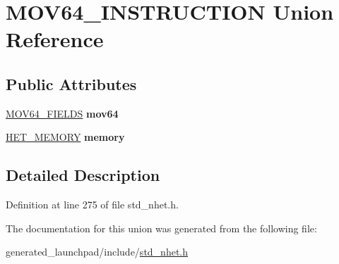 \hypertarget{unionMOV64__INSTRUCTION}{}\section{M\+O\+V64\+\_\+\+I\+N\+S\+T\+R\+U\+C\+T\+I\+ON Union Reference}
\label{unionMOV64__INSTRUCTION}
\subsection*{Public Attributes}
\begin{DoxyCompactItemize}
\item 
\mbox{\label{unionMOV64__INSTRUCTION_abbfdc4db4c42e65564e1d516d8ffa64f}} 
\mbox{\hyperlink{structmov64__format}{M\+O\+V64\+\_\+\+F\+I\+E\+L\+DS}} {\bfseries mov64}
\item 
\mbox{\label{unionMOV64__INSTRUCTION_af1332869b4112caf710fad63dfd1c7c5}} 
\mbox{\hyperlink{structmemory__format}{H\+E\+T\+\_\+\+M\+E\+M\+O\+RY}} {\bfseries memory}
\end{DoxyCompactItemize}


\subsection{Detailed Description}


Definition at line 275 of file std\+\_\+nhet.\+h.



The documentation for this union was generated from the following file\+:\begin{DoxyCompactItemize}
\item 
generated\+\_\+launchpad/include/\mbox{\hyperlink{std__nhet_8h}{std\+\_\+nhet.\+h}}\end{DoxyCompactItemize}
